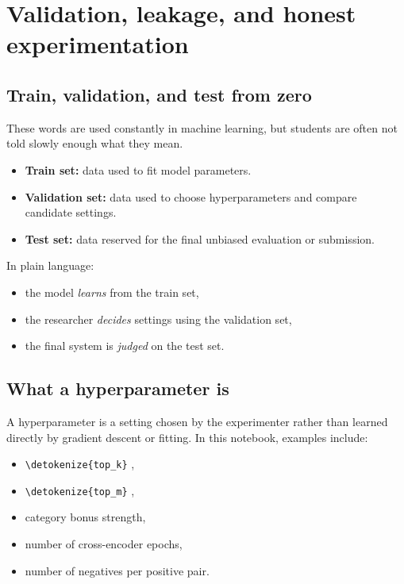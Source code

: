 \documentclass[10pt]{article}
\DeclareRobustCommand{\code}[1]{%
  \ifmmode
    \text{\nolinkurl{\detokenize{#1}}}%
  \else
    \nolinkurl{\detokenize{#1}}%
  \fi
}
\begin{document}
\section{Validation, leakage, and honest experimentation}
\label{sec:val}

\subsection{Train, validation, and test from zero}

These words are used constantly in machine learning, but students are often not told slowly enough what they mean.

\begin{itemize}
    \item \textbf{Train set:} data used to fit model parameters.
    \item \textbf{Validation set:} data used to choose hyperparameters and compare candidate settings.
    \item \textbf{Test set:} data reserved for the final unbiased evaluation or submission.
\end{itemize}

In plain language:
\begin{itemize}
    \item the model \emph{learns} from the train set,
    \item the researcher \emph{decides} settings using the validation set,
    \item the final system is \emph{judged} on the test set.
\end{itemize}

\subsection{What a hyperparameter is}

A hyperparameter is a setting chosen by the experimenter rather than learned directly by gradient descent or fitting. In this notebook, examples include:
\begin{itemize}
    \item \code{top_k},
    \item \code{top_m},
    \item category bonus strength,
    \item number of cross-encoder epochs,
    \item number of negatives per positive pair.
\end{itemize}
\end{document}
